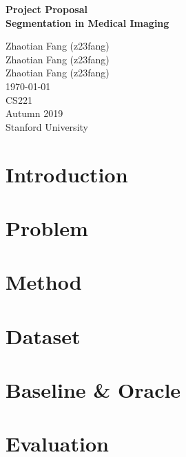 \documentclass[12pt]{article}
\begin{document}
    
\begin{titlepage}
    \centering
    \vspace*{2.5cm}
    
    \Huge
    \textbf{Project Proposal} \\
    
    \huge
    \textbf{Segmentation in Medical Imaging}
    
    \vfill
    
    \LARGE
    Zhaotian Fang (z23fang) \\
    Zhaotian Fang (z23fang) \\
    Zhaotian Fang (z23fang) \\
    \today \\
    CS221 \\
    Autumn 2019 \\
    Stanford University
\end{titlepage}

\section{Introduction}

\section{Problem}

\section{Method}

\section{Dataset}

\section{Baseline \& Oracle}

\section{Evaluation}



\end{document}
